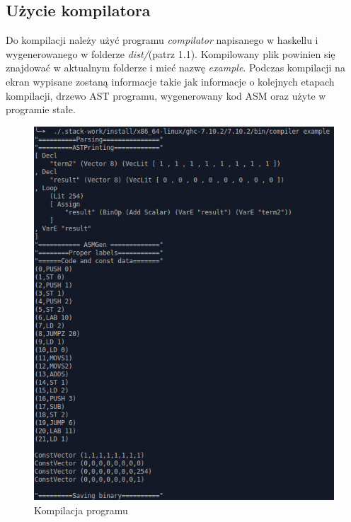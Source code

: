 \subsection{Użycie kompilatora}
Do kompilacji należy użyć programu \textit{compilator} napisanego w haskellu i wygenerowanego w folderze \textit{dist/}(patrz 1.1). Kompilowany plik powinien się znajdować w aktualnym folderze i mieć nazwę \textit{example}.
Podczas kompilacji na ekran wypisane zostaną informacje takie jak informacje o kolejnych etapach kompilacji, drzewo AST programu, wygenerowany kod ASM oraz użyte w programie stałe.
\begin{figure}[!h]
\centering
\includegraphics[scale=0.75]{images/kompilator}
\caption{Kompilacja programu}
\end{figure}
\clearpage

